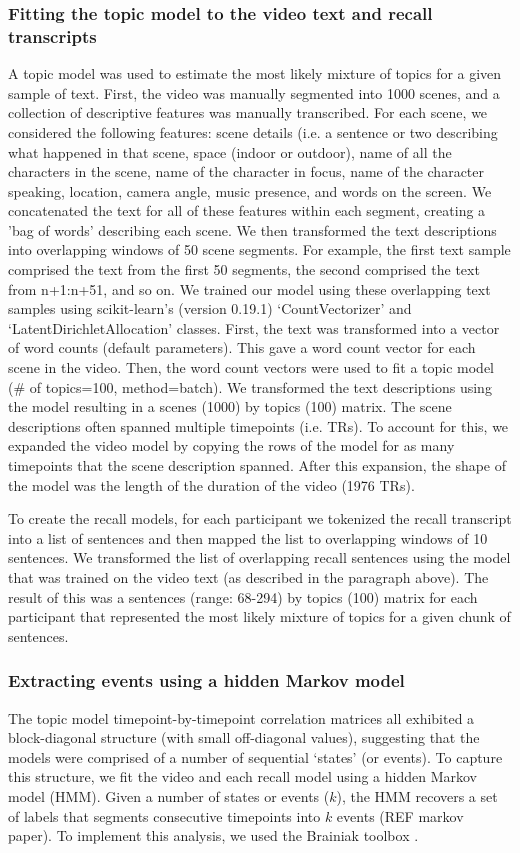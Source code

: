 \documentclass{article}
\begin{document}
{\subsubsection{Fitting the topic model to the video text and recall transcripts}
A topic model was used to estimate the most likely mixture of topics for a given sample of text. First, the video was manually segmented into 1000 scenes, and a collection of descriptive features was manually transcribed. For each scene, we considered the following features: scene details (i.e. a sentence or two describing what happened in that scene, space (indoor or outdoor), name of all the characters in the scene, name of the character in focus, name of the character speaking, location, camera angle, music presence, and words on the screen. We concatenated the text for all of these features within each segment, creating a 'bag of words' describing each scene. We then transformed the text descriptions into overlapping windows of 50 scene segments. For example, the first text sample comprised the text from the first 50 segments, the second comprised the text from n+1:n+51, and so on. We trained our model using these overlapping text samples using scikit-learn's (version 0.19.1) `CountVectorizer' and `LatentDirichletAllocation' classes.  First, the text was transformed into a vector of word counts (default parameters). This gave a word count vector for each scene in the video.  Then, the word count vectors were used to fit a topic model (\# of topics=100, method=batch). We transformed the text descriptions using the model resulting in a scenes (1000) by topics (100) matrix. The scene descriptions often spanned multiple timepoints (i.e. TRs). To account for this, we expanded the video model by copying the rows of the model for as many timepoints that the scene description spanned. After this expansion, the shape of the model was the length of the duration of the video (1976 TRs).

To create the recall models, for each participant we tokenized the recall transcript into a list of sentences and then mapped the list to overlapping windows of 10 sentences.  We transformed the list of overlapping recall sentences using the model that was trained on the video text (as described in the paragraph above). The result of this was a sentences (range: 68-294) by topics (100) matrix for each participant that represented the most likely mixture of topics for a given chunk of sentences.

\subsubsection{Extracting events using a hidden Markov model}
The topic model timepoint-by-timepoint correlation matrices all exhibited a block-diagonal structure (with small off-diagonal values), suggesting that the models were comprised of a number of sequential `states' (or events). To capture this structure, we fit the video and each recall model using a hidden Markov model (HMM). Given a number of states or events ($k$), the HMM recovers a set of labels that segments consecutive timepoints into $k$ events (REF markov paper). To implement this analysis, we used the Brainiak toolbox \citep{BaldEtal17}.

}
\end{document}

